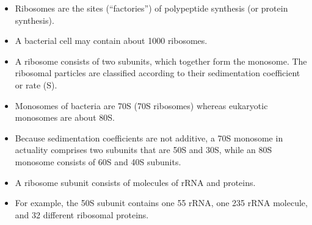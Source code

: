 \documentclass[11pt,ignorenonframetext,aspectratio=169]{beamer}
\providecommand{\tightlist}{%
  \setlength{\itemsep}{0pt}\setlength{\parskip}{0pt}}
\begin{document}
\begin{frame}{}
\protect\hypertarget{section-11}{}
\begin{itemize}
\tightlist
\item
  Ribosomes are the sites (``factories'') of polypeptide synthesis (or
  protein synthesis).
\item
  A bacterial cell may contain about 1000 ribosomes.
\item
  A ribosome consists of two subunits, which together form the monosome.
  The ribosomal particles are classified according to their
  sedimentation coefficient or rate (S).
\item
  Monosomes of bacteria are 70S (70S ribosomes) whereas eukaryotic
  monosomes are about 80S.
\item
  Because sedimentation coefficients are not additive, a 70S monosome in
  actuality comprises two subunits that are 50S and 30S, while an 80S
  monosome consists of 60S and 40S subunits.
\item
  A ribosome subunit consists of molecules of rRNA and proteins.
\item
  For example, the 50S subunit contains one 55 rRNA, one 235 rRNA
  molecule, and 32 different ribosomal proteins.
\end{itemize}
\end{frame}
\end{document}
